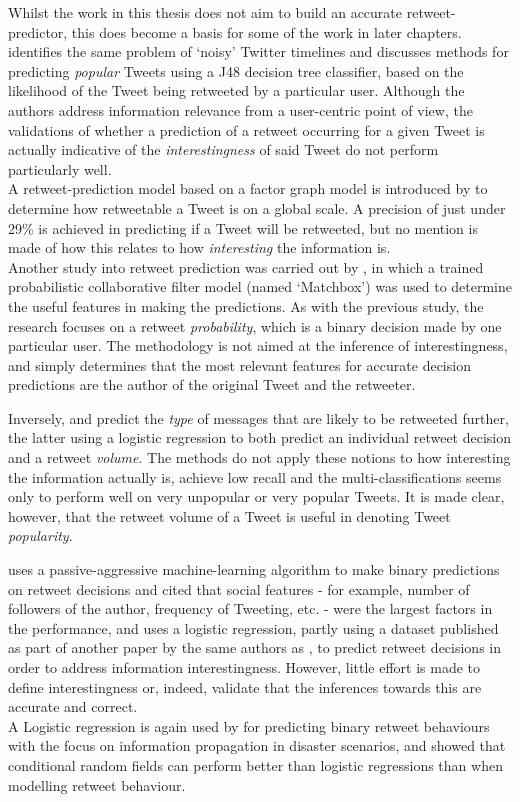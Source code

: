 Whilst the work in this thesis does not aim to build an accurate retweet-predictor, this does become a basis for some of the work in later chapters.\\
\cite{uysal11} identifies the same problem of `noisy' Twitter timelines and discusses methods for predicting \textit{popular} Tweets using a J48 decision tree classifier, based on the likelihood of the Tweet being retweeted by a particular user. Although the authors address information relevance from a user-centric point of view, the validations of whether a prediction of a retweet occurring for a given Tweet is actually indicative of the \textit{interestingness} of said Tweet do not perform particularly well.\\
A retweet-prediction model based on a factor graph model is introduced by \cite{yang10} to determine how retweetable a Tweet is on a global scale. A precision of just under 29\% is achieved in predicting if a Tweet will be retweeted, but no mention is made of how this relates to how \textit{interesting} the information is.\\
Another study into retweet prediction was carried out by \cite{zaman10}, in which a trained probabilistic collaborative filter model (named `Matchbox') was used to determine the useful features in making the predictions. As with the previous study, the research focuses on a retweet \textit{probability}, which is a binary decision made by one particular user. The methodology is not aimed at the inference of interestingness, and simply determines that the most relevant features for accurate decision predictions are the author of the original Tweet and the retweeter.

Inversely, \cite{suh10} and \cite{hong11} predict the \textit{type} of messages that are likely to be retweeted further, the latter using a logistic regression to both predict an individual retweet decision and a retweet \textit{volume}. The methods do not apply these notions to how interesting the information actually is, achieve low recall and the multi-classifications seems only to perform well on very unpopular or very popular Tweets. It is made clear, however, that the retweet volume of a Tweet is useful in denoting Tweet \textit{popularity}.

\cite{petrovic11} uses a passive-aggressive machine-learning algorithm to make binary predictions on retweet decisions and cited that social features - for example, number of followers of the author, frequency of Tweeting, etc. - were the largest factors in the performance, and \cite{naveed11} uses a logistic regression, partly using a dataset published as part of another paper by the same authors as \cite{petrovic11}, to predict retweet decisions in order to address information interestingness. However, little effort is made to define interestingness or, indeed, validate that the inferences towards this are accurate and correct.\\
A Logistic regression is again used by \cite{zhu11} for predicting binary retweet behaviours with the focus on information propagation in disaster scenarios, and \cite{peng11} showed that conditional random fields can perform better than logistic regressions than when modelling retweet behaviour.

